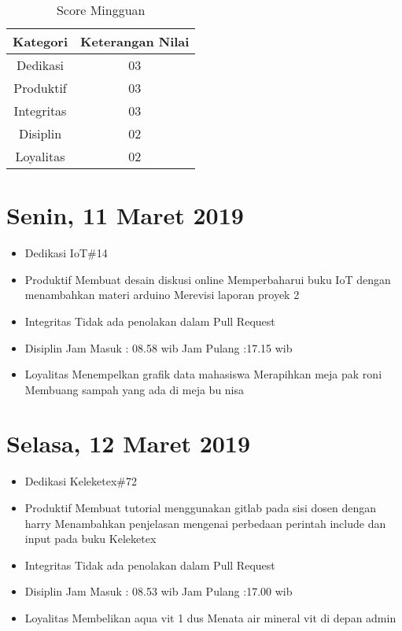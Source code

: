 \begin{table}[h]
\caption{Score Mingguan}
\centering
\begin{tabular}{|c|c|}
\hline
\textbf{Kategori}&\textbf{Keterangan Nilai}\\
\hline
Dedikasi&03\\
\hline
Produktif&03\\
\hline
Integritas&03\\
\hline
Disiplin&02\\
\hline
Loyalitas&02\\
\hline
\end{tabular}
\label{table:score mingguan}
\end{table}

\section{Senin, 11 Maret 2019}
\begin{itemize}
\item Dedikasi
\subitem IoT\#14
\item Produktif
  \subitem Membuat desain diskusi online
  \subitem Memperbaharui buku IoT dengan menambahkan materi arduino
  \subitem Merevisi laporan proyek 2
\item Integritas
  \subitem Tidak ada penolakan dalam Pull Request
\item Disiplin
  \subitem Jam Masuk : 08.58 wib
  \subitem Jam Pulang :17.15 wib
\item Loyalitas
  \subitem Menempelkan grafik data mahasiswa
  \subitem Merapihkan meja pak roni
  \subitem Membuang sampah yang ada di meja bu nisa
\end{itemize}

\section{Selasa, 12 Maret 2019}
\begin{itemize}
\item Dedikasi
\subitem Keleketex\#72
\item Produktif
  \subitem Membuat tutorial menggunakan gitlab pada sisi dosen dengan harry
  \subitem Menambahkan penjelasan mengenai perbedaan perintah include dan input pada buku Keleketex
\item Integritas
  \subitem Tidak ada penolakan dalam Pull Request
\item Disiplin
  \subitem Jam Masuk : 08.53 wib
  \subitem Jam Pulang :17.00 wib
\item Loyalitas
  \subitem Membelikan aqua vit 1 dus  
  \subitem Menata air mineral vit di depan admin
\end{itemize}

